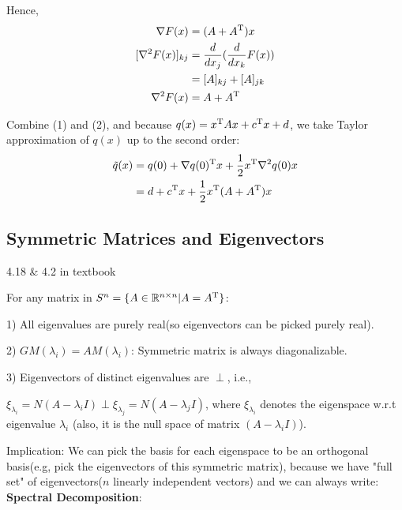 Hence,
\begin{align*}
\nabla F(x) &= (A + A^{{\rm T}})x\\
[\nabla^2F(x)]_{kj} &= \frac{d}{dx_j}(\frac{d}{d x_k}F(x))\\
&= [A]_{kj} + [A]_{jk}\\
\nabla^2F(x) &= A + A^{{\rm T}}
\end{align*}

Combine (1) and (2), and because $q(x) = x^{{\rm T}}Ax + c^{{\rm T}}x + d$, we take Taylor approximation of $q(x)$ up to the second order:
\begin{align*}
\tilde{q}(x) &= q(0) + \nabla q(0)^{{\rm T}}x + \frac{1}{2}x^{{\rm T}}\nabla^2q(0)x\\
&= d + c^{{\rm T}}x + \frac{1}{2}x^{{\rm T}}(A + A^{{\rm T}})x
\end{align*}

\subsection{Symmetric Matrices and Eigenvectors}

\begin{theorem}{4.18 \& 4.2 in textbook}
	
	For any matrix in $S^n = \{A\in \mathbb{R}^{n\times n} | A = A^{{\rm T}} \}$:
	
	1) All eigenvalues are purely real(so eigenvectors can be picked purely real).
	
	2) $GM(\lambda_i) = AM(\lambda_i)$: Symmetric matrix is always diagonalizable.
	
	3) Eigenvectors of distinct eigenvalues are $\perp$, i.e.,
	
\qquad $\xi_{\lambda_i} = N(A - \lambda_iI)\perp \xi_{\lambda_j} = N(A - \lambda_jI)$, where $\xi_{\lambda_i}$ denotes the eigenspace w.r.t eigenvalue $\lambda_i$ (also, it is the null space of matrix $(A - \lambda_iI)$).
\end{theorem}

Implication: We can pick the basis for each eigenspace to be an orthogonal basis(e.g, pick the eigenvectors of this symmetric matrix), because we have "full set" of eigenvectors($n$ linearly independent vectors) and we can always write:\\

\textbf{Spectral Decomposition}:

